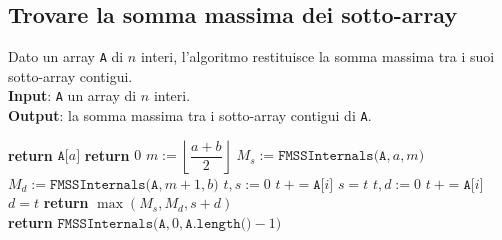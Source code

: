 \documentclass[14pt]{extreport}
\theoremstyle{definition}
\theoremstyle{definition}
\begin{document}
\subsection{Trovare la somma massima dei sotto-array}

\begin{algorithm}[H]
    \caption{
        Dato un array \texttt{A} di $n$ interi, l'algoritmo restituisce la somma massima tra i suoi sotto-array contigui.\\
        \textbf{Input}: \texttt{A} un array di $n$ interi.\\
        \textbf{Output}: la somma massima tra i sotto-array contigui di \texttt{A}.
    }

    \begin{algorithmic}[1]
                    \State \textbf{return} $\texttt{A[}a\texttt{]}$
                \Else
                    \State \textbf{return} $0$
                \EndIf
            \Else
                \State $m := \left \lfloor \dfrac{a + b}{2} \right \rfloor$
                \State $M_s := \texttt{FMSSInternals(A}, a, m\texttt{)}$
                \State $M_d := \texttt{FMSSInternals(A}, m +1, b\texttt{)}$
                \State $t, s := 0$
                 
                    \State $t \ += \texttt{A[}i\texttt{]}$
                        \State $s = t$
                    \EndIf
                \EndFor
                \State $t, d := 0$
                 
                    \State $t \ += \texttt{A[}i\texttt{]}$
                        \State $d = t$
                    \EndIf
                \EndFor
                \State \textbf{return} $\max(M_s, M_d, s + d)$
            \EndIf
        \EndFunction
        \\
            \State \textbf{return} $\texttt{FMSSInternals(A}, 0, \texttt{A.length()} - 1 \texttt{)}$ 
        \EndFunction
    \end{algorithmic}
\end{algorithm}
\end{document}

